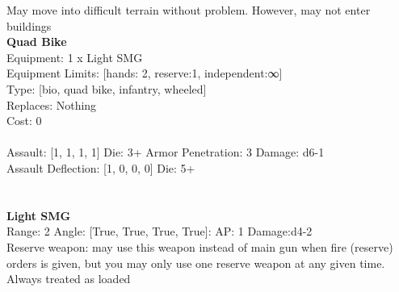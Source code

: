 \noindent May move into difficult terrain without problem. However, may not enter buildings\\ 


{\bf Quad Bike } \\
Equipment: 1 x Light SMG \\
Equipment Limits: [hands: 2, reserve:1, independent:∞] \\
Type: [bio, quad bike, infantry, wheeled] \\
Replaces: Nothing \\
Cost: 0\\
\ \\
Assault: [1, 1, 1, 1] Die: 3+ Armor Penetration: 3 Damage: d6-1 \\
Assault Deflection: [1, 0, 0, 0] Die: 5+\\
\indent  
\ \\

\ \\
{\bf Light SMG } \\



Range: 2  Angle: [True, True, True, True]: AP: 1 Damage:d4-2 \\
Reserve weapon: may use this weapon instead of main gun when fire (reserve) orders is given, but you may only use one reserve weapon at any given time.\\ 
Always treated as loaded\\ 




 
\ \\



